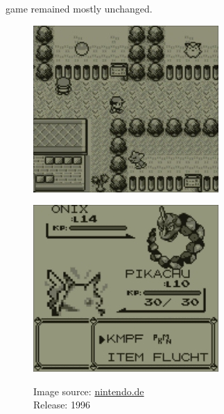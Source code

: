 game remained mostly unchanged. 
\begin{figure}[ht]
  \centering
  \begin{minipage}{.5\textwidth}
    \centering
    \includegraphics[width=.95\linewidth]{images/Red-0.jpg}
    \label{fig:red0}
  \end{minipage}%
  \begin{minipage}{.5\textwidth}
    \centering
    \includegraphics[width=.95\linewidth]{images/Red-1.jpg}
    \label{fig:red1}
  \end{minipage}
  \caption*{Image source: \href{https://www.nintendo.de/Spiele/Game-Boy/Pokemon-Rote-Edition-266109.html}{nintendo.de} \\Release: 1996}
\end{figure}
